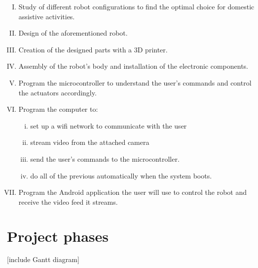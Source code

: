 	\begin{enumerate}[I.]

		\item Study of different robot configurations to find the optimal choice for domestic assistive activities.\\

		\item Design of the aforementioned robot.\\

		\item Creation of the designed parts with a 3D printer.\\

		\item Assembly of the robot's body and installation of the electronic components.\\

		\item Program the microcontroller to understand the user's commands and control the actuators accordingly.\\

		\item Program the computer to: 
			\begin{enumerate}[i.] 
			\item set up a wifi network to communicate with the user
			\item stream video from the attached camera 
			\item send the user's commands to the microcontroller.
			\item do all of the previous automatically when the system boots.\\
			\end{enumerate}

	
		\item Program the Android application the user will use to control the robot and receive the video feed it streams.

	\end{enumerate}


\section{Project phases}
[include Gantt diagram]




